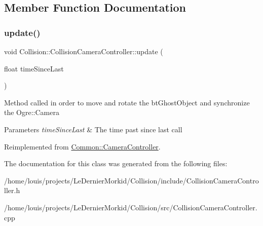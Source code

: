 \subsection{Member Function Documentation}
\mbox{\label{class_collision_1_1_collision_camera_controller_ac25037b29b022a2ccf77b16fe0bda670}} 
\subsubsection{\texorpdfstring{update()}{update()}}
{\footnotesize\ttfamily void Collision\+::\+Collision\+Camera\+Controller\+::update (\begin{DoxyParamCaption}\item[{float}]{time\+Since\+Last }\end{DoxyParamCaption})\hspace{0.3cm}{\ttfamily [virtual]}}

Method called in order to move and rotate the bt\+Ghost\+Object and synchronize the Ogre\+::\+Camera 
\begin{DoxyParams}{Parameters}
{\em time\+Since\+Last} & The time past since last call \\
\hline
\end{DoxyParams}


Reimplemented from \hyperlink{class_common_1_1_camera_controller}{Common\+::\+Camera\+Controller}.



The documentation for this class was generated from the following files\+:\begin{DoxyCompactItemize}
\item 
/home/louis/projects/\+Le\+Dernier\+Morkid/\+Collision/include/Collision\+Camera\+Controller.\+h\item 
/home/louis/projects/\+Le\+Dernier\+Morkid/\+Collision/src/Collision\+Camera\+Controller.\+cpp\end{DoxyCompactItemize}
